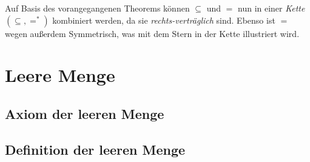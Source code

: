 \documentclass[main.tex]{subfiles}
\begin{document}
\begin{tabproof}
\end{tabproof}

\begin{tabproof}
\end{tabproof}

\begin{remark}
Auf Basis des vorangegangenen Theorems können \(\subseteq\) und \(=\) nun in einer \emph{Kette} \((\subseteq,=^{*})\) kombiniert werden,  da sie \emph{rechts-verträglich} sind. Ebenso ist \(=\) wegen  außerdem Symmetrisch, was mit dem Stern in der Kette illustriert wird.
\end{remark}



\chapter{Leere Menge}
\section{Axiom der leeren Menge}


\section{Definition der leeren Menge}
\end{document}
